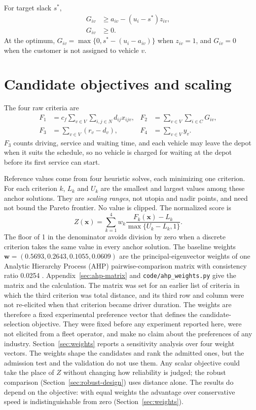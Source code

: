 \documentclass[11pt,a4paper]{article}
\begin{document}
For target slack $s^*$,
\begin{align}
 G_{iv} &\geq a_{iv}-(u_i-s^*)z_{iv}, \\
 G_{iv} &\geq 0.                                            \label{eq:slack}
\end{align}
At the optimum, $G_{iv}=\max\{0,s^*-(u_i-a_{iv})\}$ when $z_{iv}=1$, and
$G_{iv}=0$ when the customer is not assigned to vehicle $v$.

\section{Candidate objectives and scaling}\label{sec:objective-scaling}

The four raw criteria are
\begin{align}
 F_1 &= c_f\sum_{v\in V}\sum_{i,j\in N}d_{ij}x_{ijv},
 &F_2 &= \sum_{v\in V}\sum_{i\in C}G_{iv},\\
 F_3 &= \sum_{v\in V}(r_v-d_v),
 &F_4 &= \sum_{v\in V}y_v.                                 \label{eq:criteria}
\end{align}
$F_3$ counts driving, service and waiting time, and each vehicle may
leave the depot when it suits the schedule, so no vehicle is charged for waiting
at the depot before its first service can start.

Reference values come from four heuristic solves, each minimizing one criterion.
For each criterion $k$, $L_k$ and $U_k$ are the smallest and largest values
among these anchor solutions. They are \emph{scaling ranges}, not utopia and
nadir points, and need not bound the Pareto frontier. No value is clipped. The
normalized score is
\begin{equation}
 Z(\mathbf{x})=\sum_{k=1}^{4}w_k\frac{F_k(\mathbf{x})-L_k}{\max\{U_k-L_k,1\}}. \label{eq:objective}
\end{equation}
The floor of 1 in the denominator avoids division by zero when a discrete
criterion takes the same value in every anchor solution. The baseline weights
$\mathbf{w}=(0.5693,0.2643,0.1055,0.0609)$ are the principal-eigenvector weights
of one Analytic Hierarchy Process (AHP) pairwise-comparison matrix with
consistency ratio 0.0254 \cite{saaty1980}. Appendix~\ref{sec:ahp-matrix} and
\texttt{code/ahp\_weights.py} give the matrix and the calculation. The matrix was
set for an earlier list of criteria in which the third criterion was total
distance, and its third row and column were not re-elicited when that criterion
became driver duration. The weights are therefore a fixed experimental preference
vector that defines the candidate-selection objective. They were fixed before any
experiment reported here, were not elicited from a fleet operator, and make no
claim about the preferences of any industry. Section~\ref{sec:weights} reports a
sensitivity analysis over four weight vectors. The weights shape the candidates
and rank the admitted ones, but the admission test and the validation do not use
them. Any scalar objective could take the place of $Z$ without changing how
reliability is judged; the robust comparison (Section~\ref{sec:robust-design})
uses distance alone. The results do depend on the objective: with equal weights
the advantage over conservative speed is indistinguishable from zero
(Section~\ref{sec:weights}).
\end{document}
